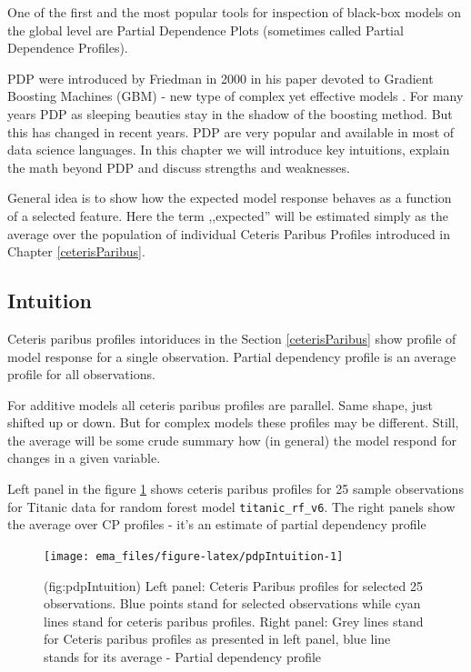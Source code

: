 \documentclass[12pt,]{krantz}
\begin{document}
One of the first and the most popular tools for inspection of black-box models on the global level are Partial Dependence Plots (sometimes called Partial Dependence Profiles).

PDP were introduced by Friedman in 2000 in his paper devoted to Gradient Boosting Machines (GBM) - new type of complex yet effective models \citep{Friedman00greedyfunction}. For many years PDP as sleeping beauties stay in the shadow of the boosting method. But this has changed in recent years. PDP are very popular and available in most of data science languages. In this chapter we will introduce key intuitions, explain the math beyond PDP and discuss strengths and weaknesses.

General idea is to show how the expected model response behaves as a function of a selected feature. Here the term ,,expected'' will be estimated simply as the average over the population of individual Ceteris Paribus Profiles introduced in Chapter \ref{ceterisParibus}.

\hypertarget{PDPIntuition}{%
\subsection{Intuition}\label{PDPIntuition}}

Ceteris paribus profiles intoriduces in the Section \ref{ceterisParibus} show profile of model response for a single observation.
Partial dependency profile is an average profile for all observations.

For additive models all ceteris paribus profiles are parallel. Same shape, just shifted up or down. But for complex models these profiles may be different.
Still, the average will be some crude summary how (in general) the model respond for changes in a given variable.

Left panel in the figure \ref{fig:pdpIntuition} shows ceteris paribus profiles for 25 sample observations for Titanic data for random forest model \texttt{titanic\_rf\_v6}. The right panels show the average over CP profiles - it's an estimate of partial dependency profile

\begin{figure}

{\centering \texttt{[image: ema\_files/figure-latex/pdpIntuition-1]} 

}

\caption{(fig:pdpIntuition) Left panel: Ceteris Paribus profiles for selected 25 observations. Blue points stand for selected observations while cyan lines stand for ceteris paribus profiles. Right panel: Grey lines stand for Ceteris paribus profiles  as presented in left panel, blue line stands for its average - Partial dependency profile}\label{fig:pdpIntuition}
\end{figure}
\end{document}
